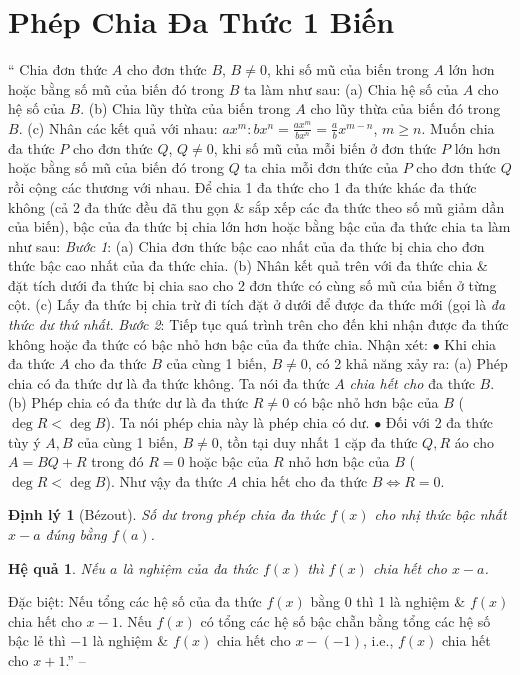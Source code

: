 \documentclass{article}
\numberwithin{equation}{section}
\newtheorem{dinhly}{Định lý}[section]
\newtheorem{hequa}{Hệ quả}[section]
\begin{document}

\section{Phép Chia Đa Thức 1 Biến}
`` Chia đơn thức $A$ cho đơn thức $B$, $B\ne0$, khi số mũ của biến trong $A$ lớn hơn hoặc bằng số mũ của biến đó trong $B$ ta làm như sau: (a) Chia hệ số của $A$ cho hệ số của $B$. (b) Chia lũy thừa của biến trong $A$ cho lũy thừa của biến đó trong $B$. (c) Nhân các kết quả với nhau: $ax^m:bx^n = \frac{ax^m}{bx^n} = \frac{a}{b}x^{m-n}$, $m\ge n$.  Muốn chia đa thức $P$ cho đơn thức $Q$, $Q\ne0$, khi số mũ của mỗi biến ở đơn thức $P$ lớn hơn hoặc bằng số mũ của biến đó trong $Q$ ta chia mỗi đơn thức của $P$ cho đơn thức $Q$ rồi cộng các thương với nhau.  Để chia 1 đa thức cho 1 đa thức khác đa thức không (cả 2 đa thức đều đã thu gọn \& sắp xếp các đa thức theo số mũ giảm dần của biến), bậc của đa thức bị chia lớn hơn hoặc bằng bậc của đa thức chia ta làm như sau: \textit{Bước 1}: (a) Chia đơn thức bậc cao nhất của đa thức bị chia cho đơn thức bậc cao nhất của đa thức chia. (b) Nhân kết quả trên với đa thức chia \& đặt tích dưới đa thức bị chia sao cho 2 đơn thức có cùng số mũ của biến ở từng cột. (c) Lấy đa thức bị chia trừ đi tích đặt ở dưới để được đa thức mới (gọi là \textit{đa thức dư thứ nhất}. \textit{Bước 2}: Tiếp tục quá trình trên cho đến khi nhận được đa thức không hoặc đa thức có bậc nhỏ hơn bậc của đa thức chia.  Nhận xét: $\bullet$ Khi chia đa thức $A$ cho đa thức $B$ của cùng 1 biến, $B\ne0$, có 2 khả năng xảy ra: (a) Phép chia có đa thức dư là đa thức không. Ta nói đa thức $A$ \textit{chia hết cho} đa thức $B$. (b) Phép chia có đa thức dư là đa thức $R\ne0$ có bậc nhỏ hơn bậc của $B$ ($\deg R < \deg B$). Ta nói phép chia này là phép chia có dư. $\bullet$ Đối với 2 đa thức tùy ý $A,B$ của cùng 1 biến, $B\ne0$, tồn tại duy nhất 1 cặp đa thức $Q,R$ áo cho $A = BQ + R$ trong đó $R = 0$ hoặc bậc của $R$ nhỏ hơn bậc của $B$ ($\deg R < \deg B$). Như vậy đa thức $A$ chia hết cho đa thức $B\Leftrightarrow R = 0$.

\begin{dinhly}[B\'ezout]
	Số dư trong phép chia đa thức $f(x)$ cho nhị thức bậc nhất $x - a$ đúng bằng $f(a)$.
\end{dinhly}

\begin{hequa}
	Nếu $a$ là nghiệm của đa thức $f(x)$ thì $f(x)$ chia hết cho $x - a$.
\end{hequa}
Đặc biệt: Nếu tổng các hệ số của đa thức $f(x)$ bằng 0 thì 1 là nghiệm \& $f(x)$ chia hết cho $x - 1$. Nếu $f(x)$ có tổng các hệ số bậc chẵn bằng tổng các hệ số bậc lẻ thì $-1$ là nghiệm \& $f(x)$ chia hết cho $x - (-1)$, i.e., $f(x)$ chia hết cho $x + 1$.'' -- \cite[Chap. III, \S5, pp. 44--45]{Tuyen_Toan_7}
\end{document}
